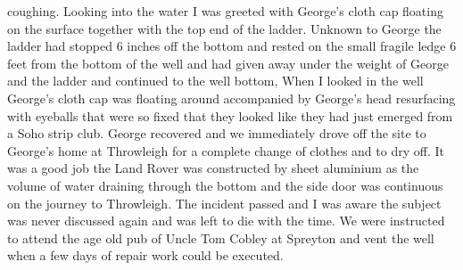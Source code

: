 coughing. Looking into the water I was greeted with George's cloth cap floating
on the surface together with the top end of the ladder. Unknown to George the
ladder had stopped 6 inches off the bottom and rested on the small fragile
ledge 6 feet from the bottom of the well and had given away under the weight of
George and the ladder and continued to the well bottom,  When I looked in the
well George's cloth cap was floating around accompanied by George's head
resurfacing with eyeballs that were so fixed that they looked like they had
just emerged from a Soho strip club. George recovered and we immediately drove
off the site to George's home at Throwleigh for a complete change of clothes
and to dry off. It was a good job the Land Rover was constructed by sheet
aluminium as the volume of water draining through the bottom and the side door
was continuous on the journey to Throwleigh. The incident passed and I was
aware the subject was never discussed again and was left to die with the time.
We were instructed to attend the age old pub of Uncle Tom Cobley at Spreyton
and vent the well when a few days of repair work could be executed.
